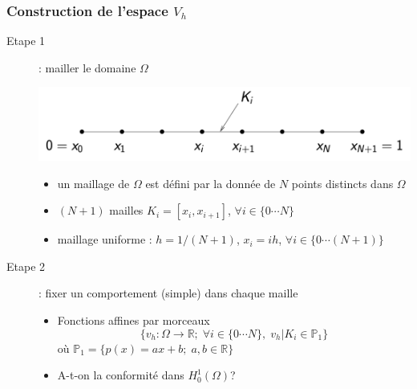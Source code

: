 \documentclass{beamer}
\begin{document}
\begin{frame}
\frametitle{Construction de l'espace $V_h$}

\begin{description}
\item[Etape 1]: mailler le domaine $\Omega$
\begin{center}
\includegraphics[scale=0.2]{mailleD1.png} 
\end{center}
\begin{itemize}
\item un maillage de $\Omega$ est défini par la donnée de $N$ points distincts dans $\Omega$
\item $(N + 1)$ mailles $K_i = [x_i, x_{i+1}]$,  $\forall i \in\{0\cdots N\}$
\item maillage uniforme : $h = 1/(N + 1)$, $x_i = ih$, $\forall i \in\{0\cdots (N+1)\}$
\end{itemize}
\item[Etape 2]: fixer un comportement (simple) dans chaque maille
\begin{itemize}
\item Fonctions affines par morceaux
\[\{v_h : \Omega \to \mathbb{R}; \; \forall i \in  \{0\cdots N\}, \; v_h|K_i \in \mathbb{P}_1\}\]
où $\mathbb{P}_1= \{p(x) = ax + b;\; a, b \in\mathbb{R}\}$
\item A-t-on la conformité dans $H^1_0(\Omega)$?
\end{itemize}
\end{description}
\end{frame}
\end{document}
